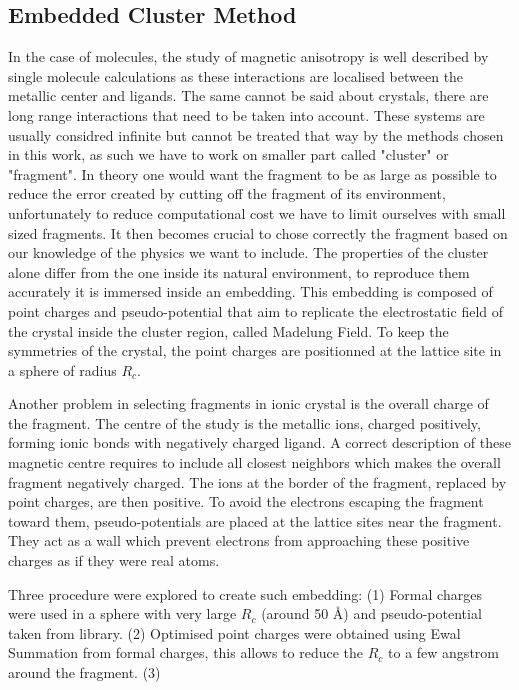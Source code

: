 \documentclass[12pt]{article}
\numberwithin{equation}{section}
\begin{document}
\subsection{Embedded Cluster Method}

In the case of molecules, the study of magnetic anisotropy is well described by single molecule calculations as these interactions are localised between the metallic center and ligands. 
The same cannot be said about crystals, there are long range interactions that need to be taken into account. 
These systems are usually considred infinite but cannot be treated that way by the methods chosen in this work, as such we have to work on smaller part called "cluster" or "fragment".
In theory one would want the fragment to be as large as possible to reduce the error created by cutting off the fragment of its environment, unfortunately to reduce computational cost we have to limit ourselves with small sized fragments. 
It then becomes crucial to chose correctly the fragment based on our knowledge of the physics we want to include.
The properties of the cluster alone differ from the one inside its natural environment, to reproduce them accurately it is immersed inside an embedding. 
This embedding is composed of point charges and pseudo-potential that aim to replicate the electrostatic field of the crystal inside the cluster region, called Madelung Field. 
To keep the symmetries of the crystal, the point charges are positionned at the lattice site in a sphere of radius $R_c$. 

Another problem in selecting fragments in ionic crystal is the overall charge of the fragment.
The centre of the study is the metallic ions, charged positively, forming ionic bonds with negatively charged ligand.
A correct description of these magnetic centre requires to include all closest neighbors which makes the overall fragment negatively charged.
The ions at the border of the fragment, replaced by point charges, are then positive.
To avoid the electrons escaping the fragment toward them, pseudo-potentials are placed at the lattice sites near the fragment.
They act as a wall which prevent electrons from approaching these positive charges as if they were real atoms.

Three procedure were explored to create such embedding:
(1) Formal charges were used in a sphere with very large $R_c$ (around 50 \AA{}) and pseudo-potential taken from library.
(2) Optimised point charges were obtained using Ewal Summation from formal charges, this allows to reduce the $R_c$ to a few angstrom around the fragment.
(3)  
\end{document}
